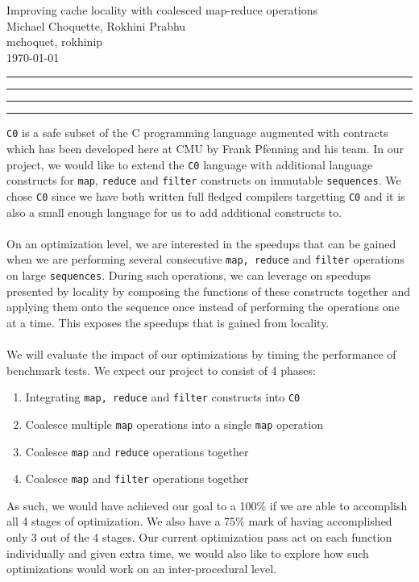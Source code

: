 \documentclass[11pt]{article}
\newcounter{questionCounter}
\newcounter{partCounter}[questionCounter]
\newenvironment{question}[2][\arabic{questionCounter}]{%
    \setcounter{partCounter}{0}%
    \vspace{.25in} \hrule \vspace{0.5em}%
        \noindent{\bf #2}%
    \vspace{0.8em} \hrule \vspace{.10in}%
    \addtocounter{questionCounter}{1}%
}{}
\newcommand{\myname}{Michael Choquette, Rokhini Prabhu}
\newcommand{\myandrew}{mchoquet, rokhinip}
\newcommand{\projectname}{Improving cache locality with coalesced map-reduce
operations}
\begin{document}
\thispagestyle{plain}

\begin{center}
{\Large \projectname} \\
\myname \\
\myandrew \\
\today
\end{center}

\begin{question}{Project Web Page}

\end{question}

\begin{question}{Project Description}
\texttt{C0} is a safe subset of the C programming language augmented with
contracts which has been developed here at CMU by Frank Pfenning and his team. 
In our project, we would like to extend the \texttt{C0} language with additional
language constructs for \texttt{map}, \texttt{reduce} and \texttt{filter}
constructs on immutable \texttt{sequences}. We chose \texttt{C0} since we have
both written full fledged compilers targetting \texttt{C0} and it is also a
small enough language for us to add additional constructs to. \\
\\ On an optimization level, we are interested in the speedups that can be
gained when we are performing several consecutive \texttt{map, reduce} 
and \texttt{filter} operations on large \texttt{sequences}. 
During such operations, we can leverage on speedups presented by
locality  by composing the functions of these constructs
together and applying them onto the sequence once instead of performing the
operations one at a time. This exposes the speedups that is gained from
locality. 
\\
\\ 
We will evaluate the impact of our optimizations by timing the performance of
benchmark tests. We expect our project to consist of 4 phases:
\begin{enumerate}
\item Integrating \texttt{map, reduce} and \texttt{filter} constructs into
\texttt{C0}
\item Coalesce multiple \texttt{map} operations into a single \texttt{map}
operation
\item Coalesce \texttt{map} and \texttt{reduce} operations together
\item Coalesce \texttt{map} and \texttt{filter} operations together
\end{enumerate}

As such, we would have achieved our goal to a 100\% if we are able to accomplish
all 4 stages of optimization. We also have a 75\% mark of having accomplished
only 3 out of the 4 stages. Our current optimization pass act on each function
individually and given extra time, we would also like to explore how such
optimizations would work on an inter-procedural level.
\end{question}
\newpage
\end{document}
